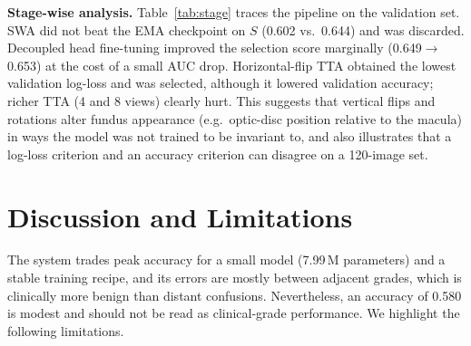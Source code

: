 \documentclass[10pt,twocolumn]{article}
\begin{document}
\textbf{Stage-wise analysis.} Table~\ref{tab:stage} traces the pipeline on the validation set. SWA did not beat the EMA checkpoint on $S$ (0.602 vs.\ 0.644) and was discarded. Decoupled head fine-tuning improved the selection score marginally (0.649$\to$0.653) at the cost of a small AUC drop. Horizontal-flip TTA obtained the lowest validation log-loss and was selected, although it lowered validation accuracy; richer TTA (4 and 8 views) clearly hurt. This suggests that vertical flips and rotations alter fundus appearance (e.g.\ optic-disc position relative to the macula) in ways the model was not trained to be invariant to, and also illustrates that a log-loss criterion and an accuracy criterion can disagree on a 120-image set.

\section{Discussion and Limitations}\label{sec:disc}
The system trades peak accuracy for a small model (7.99\,M parameters) and a stable training recipe, and its errors are mostly between adjacent grades, which is clinically more benign than distant confusions. Nevertheless, an accuracy of 0.580 is modest and should not be read as clinical-grade performance. We highlight the following limitations.
\end{document}
